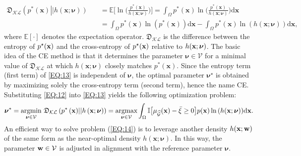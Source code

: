\documentclass[preprint,3p]{elsarticle}
\begin{document}
\begin{linenumbers}
\begin{equation}
\begin{aligned} 
\mathfrak{D}_{\mathcal{KL}}\left(p^{*}\left(\mathbf{x}\right)\right|\!\left|h\left(\mathbf{x};\boldsymbol{\nu}\right)\right) \quad & = \mathbb{E}\biggr[\ln\Biggl(\frac{p^{*}\left(\mathbf{x}\right)}{h(\mathbf{x};\boldsymbol{\nu})}\Biggr)\biggr]=\int_{\Omega}p^{*}\left(\mathbf{x}\right)\ln\Biggl(\frac{p^{*}\left(\mathbf{x}\right)}{h(\mathbf{x};\boldsymbol{\nu})}\Biggr)\mathrm d\mathbf{x}\\
&=\int_{\Omega}p^{*}\left(\mathbf{x}\right)\ln\left(p^{*}\left(\mathbf{x}\right)\right)\mathrm d\mathbf{x} - \int_{\Omega}p^{*}\left(\mathbf{x}\right)\ln\left(h(\mathbf{x};\boldsymbol{\nu})\right)\mathrm d\mathbf{x},
\end{aligned}
\label{EQ:13}
\end{equation}
where $\mathbb{E}[\cdot]$ denotes the expectation operator.
$\mathfrak{D}_{\mathcal{KL}}$ is the difference between the entropy of $p^\star({\bf x})$ and the cross-entropy of  
$p^\star({\bf x})$ relative to $h({\bf x};\boldsymbol{\nu})$.
The basic idea of the CE method is that it determines the parameter $\boldsymbol{\nu} \in \mathcal{V}$ for a minimal value of $\mathfrak{D}_{\mathcal{KL}}$ at which ${h}\left(\textbf{x};\boldsymbol{\nu}\right)$ closely matches $p^{*}\left(\mathbf{x}\right)$. 
Since the entropy term (first term) of \cref{EQ:13} is independent of $\boldsymbol{\nu}$, the optimal parameter $\boldsymbol{\nu}^\star$ is obtained by maximizing solely the cross-entropy term (second term), hence the name CE. Substituting \cref{EQ:12} into \cref{EQ:13} yields the following optimization problem:
\begin{equation}
\boldsymbol{\nu}^{*} = \underset{\boldsymbol{\nu} \in \mathcal{V}}{\text{argmin}}\ \mathfrak{D}_{\mathcal{KL}}\left(p^{*}\left(\mathbf{x}\right)\right|\!\left|h\left(\mathbf{x};\boldsymbol{\nu}\right)\right) = \underset{\boldsymbol{\nu} \in \mathcal{V}}{\text{argmax}}\int_\Omega {\mathbb{I}\bigr[\mu_{\widehat{\mathcal{G}}}(\textbf{x}) - \bar\xi \geq 0 \bigl] p({\bf x}) \ln\left(h(\mathbf{x};\boldsymbol{\nu})\right)}\mathrm{d}\textbf{x}.
\label{EQ:14}
\end{equation}
An efficient way to solve problem (\ref{EQ:14}) is to leverage another density $h(\mathbf{x};{\bf w})$ of the same form as the near-optimal density $h(\mathbf{x};\boldsymbol{\nu})$. In this way, the parameter ${\bf w} \in \mathcal{V}$ is adjusted in alignment with the reference parameter $\boldsymbol{\nu}$.

\end{linenumbers}
\end{document}
